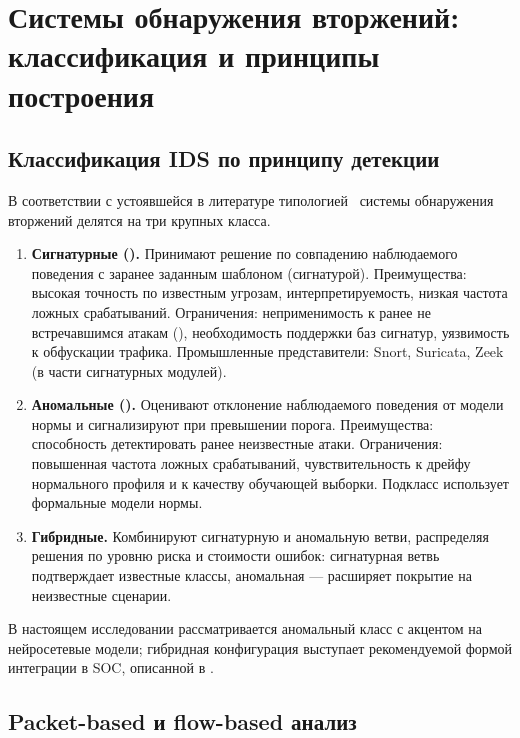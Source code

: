 \section{Системы обнаружения вторжений: классификация и принципы построения}

\subsection{Классификация IDS по принципу детекции}

В соответствии с устоявшейся в литературе типологией~\cite{khraisat2019survey,
ahmad2021nids, ferrag2020dlcyber} системы обнаружения вторжений делятся на три
крупных класса.

\begin{enumerate}
    \item \textbf{Сигнатурные ().}
    Принимают решение по совпадению наблюдаемого поведения с заранее заданным
    шаблоном (сигнатурой). Преимущества: высокая точность по известным угрозам,
    интерпретируемость, низкая частота ложных срабатываний. Ограничения:
    неприменимость к ранее не встречавшимся атакам (),
    необходимость поддержки баз сигнатур, уязвимость к обфускации трафика.
    Промышленные представители: Snort, Suricata, Zeek (в части сигнатурных
    модулей).
    \item \textbf{Аномальные ().} Оценивают отклонение
    наблюдаемого поведения от модели нормы и сигнализируют при превышении
    порога. Преимущества: способность детектировать ранее неизвестные атаки.
    Ограничения: повышенная частота ложных срабатываний, чувствительность к
    дрейфу нормального профиля и к качеству обучающей выборки. Подкласс
     использует формальные модели нормы.
    \item \textbf{Гибридные.} Комбинируют сигнатурную и аномальную ветви,
    распределяя решения по уровню риска и стоимости ошибок: сигнатурная ветвь
    подтверждает известные классы, аномальная --- расширяет покрытие на
    неизвестные сценарии.
\end{enumerate}

В настоящем исследовании рассматривается аномальный класс с акцентом на
нейросетевые модели; гибридная конфигурация выступает рекомендуемой формой
интеграции в SOC, описанной в .

\subsection{Packet-based и flow-based анализ}

